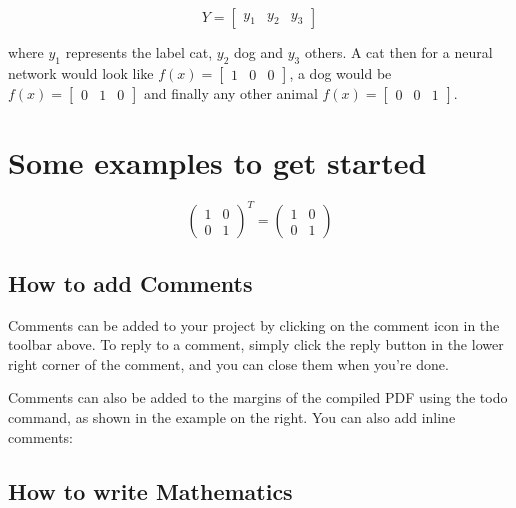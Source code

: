 \documentclass[a4paper]{article}
\begin{document}
\begin{equation}
  Y=\begin{bmatrix}
    y_{1} &   y_{2} & y_{3}
  \end{bmatrix}
\end{equation}

where $y_{1}$ represents the label cat, $y_{2}$ dog and $y_{3}$ others. A cat then for a neural network would look like $f(x) = \begin{bmatrix} 1 &   0 & 0 \end{bmatrix}$, a dog would be $f(x) = \begin{bmatrix} 0 &  1 & 0 \end{bmatrix}$ and finally any other animal $f(x) = \begin{bmatrix} 0 & 0 & 1 \end{bmatrix}$.

\section{Some examples to get started}

\[ \left( \begin{array}{cc}
1 & 0 \\
0 & 1
\end{array} \right)^{T}
%
=
\left( \begin{array}{cc}
1 & 0 \\
0 & 1
\end{array} \right)
\]

\subsection{How to add Comments}

Comments can be added to your project by clicking on the comment icon in the toolbar above. %
%
%
To reply to a comment, simply click the reply button in the lower right corner of the comment, and you can close them when you're done.

Comments can also be added to the margins of the compiled PDF using the todo command, as shown in the example on the right. You can also add inline comments:


\subsection{How to write Mathematics}
\end{document}

